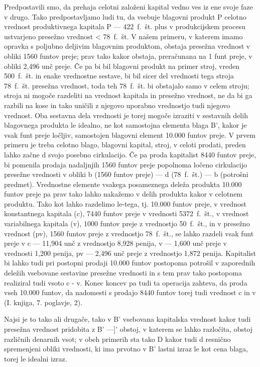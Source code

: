 \documentclass[kapital_02.tex]{subfiles}
\begin{document}
Predpostavili smo, da prehaja celotni založeni kapital vedno ves iz ene svoje faze v drugo. Tako predpostavljamo ludi tu, da vsebuje blagovni produkt P celotno vrednost produktivnega kapitala P — 422~f.~št. plus v produkcijskem procesu ustvarjeno presežno vrednost < 78~f.~št. V našem primeru, v katerem imamo opravka s poljubno deljivim blagovnim produktom, obstaja presežna vrednost v obliki 1560 funtov preje; prav tako kakor obstaja, preračunana na 1 funt preje, v obliki 2,496 unč preje. Če pa bi bil blagovni produkt na primer stroj, vreden 500~f.~št. in enake vrednostne sestave, bi bil sicer del vrednosti tega stroja 78~f.~št. presežna vrednost, toda teh 78~f.~št. bi obstajalo samo v celem stroju; stroja ni mogoče razdeliti na vrednost kapitala in presežno vrednost, ne da bi ga razbili na kose in tako uničili z njegovo uporabno vrednostjo tudi njegovo vrednost. Oba sestavna dela vrednosti je torej mogoče izraziti v sestavnih delih blagovnega produkta le idealno, ne kot samostojna elementa blaga B', kakor je vsak funt preje ločljiv, samostojen blagovni element 10.000 funtov preje. V prvem primeru je treba celotno blago, blagovni kapital, stroj, v celoti prodati, preden lahko začne d svojo posebno cirkulacijo. Če pa proda kapitalist 8440 funtov preje, bi pomenila prodaja nadaljnjih 1560 funtov preje popolnoma ločeno cirkulacijo presežne vrednosti v obliki b (1560 funtov preje) — d (78~f.~št.) — b (potrošni predmet). Vrednostne elemente vsakega posameznega deleža produkta 10.000 funtov preje pa prav tako lahko nakažemo v delih produkta kakor v celotnem produktu. Tako kot lahko razdelimo le-tega, tj. 10.000 funtov preje, v vrednost konstantnega kapitala (c), 7440 funtov preje v vrednosti 5372~f.~št., v vrednost variabilnega kapitala (v), 1000 funtov preje z vrednostjo 50~f.~št., in v presežno vrednost (pv), 1560 funtov preje z vrednostjo 78~f.~št., se lahko razdeli vsak funt preje v c — 11,904 unč z vrednostjo 8,928 penija, v — 1,600 unč preje v vrednosti 1,200 penija, pv — 2,496 unč preje z vrednostjo 1,872 penija. Kapitalist bi lahko tudi pri postopni prodaji 10.000 funtov postopoma potrošil v zaporednih deležih vsebovane sestavine presežne vrednosti in s tem prav tako postopoma realiziral tudi vsoto c - v. Konec koncev pa tudi ta operacija zahteva, da proda vseh 10.000 funtov, da nadomesti s prodajo 8440 funtov torej tudi vrednost c in v (I. knjiga, 7. poglavje, 2).

Najsi je to tako ali drugače, tako v B' vsebovana kapitalska vrednost kakor tudi presežna vrednost pridobita z B' —]' obstoj, v katerem se lahko razločita, obstoj različnih denarnih vsot; v obeh primerih sta tako D kakor tudi d resnično spremenjeni obliki vrednosti, ki ima prvotno v B' lastni izraz le kot cena blaga, torej le idealni izraz.
\end{document}
